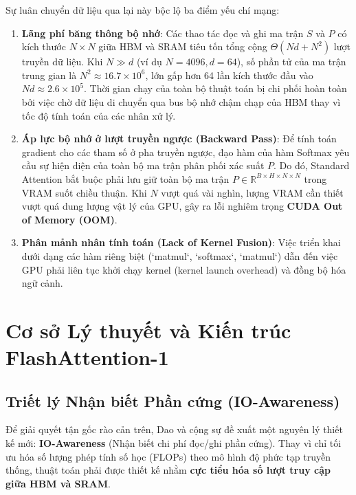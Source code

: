 \documentclass[10pt,a4paper]{article}
\begin{document}
Sự luân chuyển dữ liệu qua lại này bộc lộ ba điểm yếu chí mạng:
\begin{enumerate}
    \item \textbf{Lãng phí băng thông bộ nhớ}: Các thao tác đọc và ghi ma trận $S$ và $P$ có kích thước $N \times N$ giữa HBM và SRAM tiêu tốn tổng cộng $\Theta(Nd + N^2)$ lượt truyền dữ liệu. Khi $N \gg d$ (ví dụ $N=4096, d=64$), số phần tử của ma trận trung gian là $N^2 \approx 16.7 \times 10^6$, lớn gấp hơn 64 lần kích thước đầu vào $Nd \approx 2.6 \times 10^5$. Thời gian chạy của toàn bộ thuật toán bị chi phối hoàn toàn bởi việc chờ dữ liệu di chuyển qua bus bộ nhớ chậm chạp của HBM thay vì tốc độ tính toán của các nhân xử lý.
    \item \textbf{Áp lực bộ nhớ ở lượt truyền ngược (Backward Pass)}: Để tính toán gradient cho các tham số ở pha truyền ngược, đạo hàm của hàm Softmax yêu cầu sự hiện diện của toàn bộ ma trận phân phối xác suất $P$. Do đó, Standard Attention bắt buộc phải lưu giữ toàn bộ ma trận $P \in \mathbb{R}^{B \times H \times N \times N}$ trong VRAM suốt chiều thuận. Khi $N$ vượt quá vài nghìn, lượng VRAM cần thiết vượt quá dung lượng vật lý của GPU, gây ra lỗi nghiêm trọng \textbf{CUDA Out of Memory (OOM)}.
    \item \textbf{Phân mảnh nhân tính toán (Lack of Kernel Fusion)}: Việc triển khai dưới dạng các hàm riêng biệt (`matmul`, `softmax`, `matmul`) dẫn đến việc GPU phải liên tục khởi chạy kernel (kernel launch overhead) và đồng bộ hóa ngữ cảnh.
\end{enumerate}

\section{Cơ sở Lý thuyết và Kiến trúc FlashAttention-1}
\label{sec:theory}

\subsection{Triết lý Nhận biết Phần cứng (IO-Awareness)}
Để giải quyết tận gốc rào cản trên, Dao và cộng sự \cite{dao2022flashattention} đề xuất một nguyên lý thiết kế mới: \textbf{IO-Awareness} (Nhận biết chi phí đọc/ghi phần cứng). Thay vì chỉ tối ưu hóa số lượng phép tính số học (FLOPs) theo mô hình độ phức tạp truyền thống, thuật toán phải được thiết kế nhằm \textbf{cực tiểu hóa số lượt truy cập giữa HBM và SRAM}.
\end{document}
